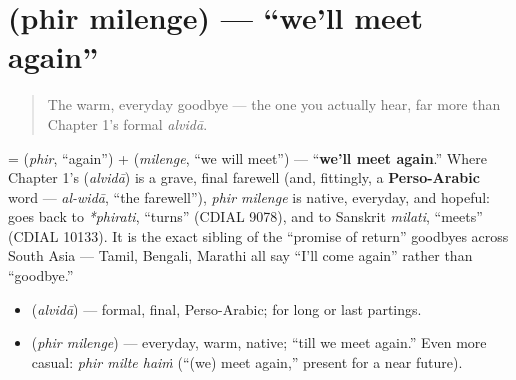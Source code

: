 \section[\texorpdfstring{\hi{फिर} \hi{मिलेंगे} (phir milenge)}{फिर मिलेंगे (phir milenge)}]{  (phir milenge) — \textquotedblleft{}we'll meet again\textquotedblright{}}

\label{lesson:HI-C04-phir-milenge}



\begin{quote}
The warm, everyday goodbye — the one you actually hear, far more than Chapter 1's formal \emph{alvidā}.
\end{quote}

\begin{cousinweb}
\textbf{ } = \textbf{} (\emph{phir}, \textquotedblleft{}again\textquotedblright{}) + \textbf{} (\emph{milenge}, \textquotedblleft{}we will meet\textquotedblright{}) — \textquotedblleft{}\textbf{we'll meet again}.\textquotedblright{} Where Chapter 1's \textbf{} (\emph{alvidā}) is a grave, final farewell (and, fittingly, a \textbf{Perso-Arabic} word — \emph{al-widā}, \textquotedblleft{}the farewell\textquotedblright{}), \emph{phir milenge} is native, everyday, and hopeful: \textbf{} goes back to \emph{*phirati}, \textquotedblleft{}turns\textquotedblright{} (CDIAL 9078), and \textbf{} to Sanskrit \emph{milati}, \textquotedblleft{}meets\textquotedblright{} (CDIAL 10133). It is the exact sibling of the \textquotedblleft{}promise of return\textquotedblright{} goodbyes across South Asia — Tamil, Bengali, Marathi all say \textquotedblleft{}I'll come again\textquotedblright{} rather than \textquotedblleft{}goodbye.\textquotedblright{}
\end{cousinweb}

\begin{grammarlens}[title={Grammar Lens: two registers of goodbye}]
\begin{itemize}
\raggedright
  \item \textbf{} (\emph{alvidā}) — formal, final, Perso-Arabic; for long or last partings.
  \item \textbf{ } (\emph{phir milenge}) — everyday, warm, native; \textquotedblleft{}till we meet again.\textquotedblright{} Even more casual: \emph{phir milte haiṁ} (\textquotedblleft{}(we) meet again,\textquotedblright{} present for a near future).
\end{itemize}
\end{grammarlens}

